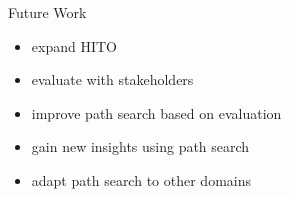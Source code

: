 \documentclass[aspectratio=1610,12pt]{beamer}
\newcommand{\imageslide}[4][]
{
\newgeometry{margin=0cm,top=1em}
\begin{frame}[plain]{~~~~#2}
\vspace{0.2em}
\centering\texttt{[image: \#3]}
\\#1
\note{#4}
\end{frame}
\restoregeometry
}
\begin{document}
\iffalse
\newgeometry{margin=0cm,top=1em}
\begin{frame}[plain]{~~~~Domain}
\end{frame}
\restoregeometry




\newgeometry{margin=0cm,top=1em}
\begin{frame}[plain]{~~~~Transformation}
\end{frame}
\restoregeometry

\begin{frame}[plain]{~~~~Storage/Query, Author, Interlink \& Browse}
\begin{columns}[t]
\column{.5\textwidth}
\centering
\column{.5\textwidth}
\centering
\end{columns}
\end{frame}
\fi



\begin{frame}{Future Work}
\begin{itemize}
\item expand HITO
\item evaluate with stakeholders 
\item improve path search based on evaluation
\item gain new insights using path search
\item adapt path search to other domains
\end{itemize}
\end{frame}
\end{document}

